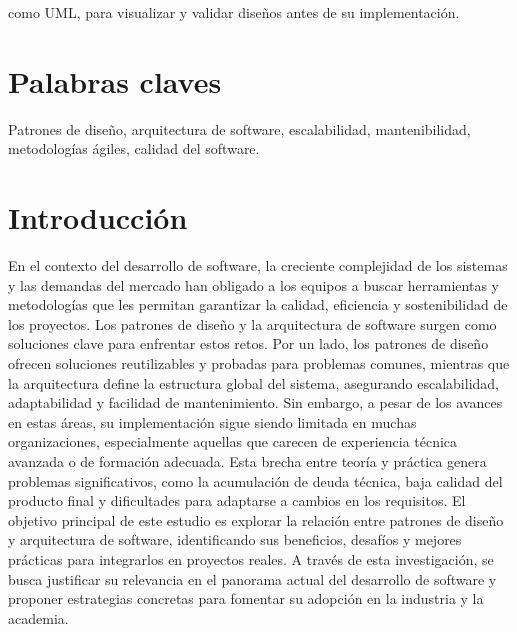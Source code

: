 \documentclass[conference]{IEEEtran}
\begin{document}
como UML, para visualizar y validar diseños antes de su implementación. 


\section{Palabras claves}
Patrones de diseño, arquitectura de software, escalabilidad, mantenibilidad, metodologías ágiles, calidad del software.

\section{Introducci\'on}
En el contexto del desarrollo de software, la creciente complejidad de los sistemas y las demandas del mercado han obligado a los equipos a buscar herramientas y metodologías que les permitan garantizar la calidad, eficiencia y sostenibilidad de los proyectos. Los patrones de diseño y la arquitectura de software surgen como soluciones clave para enfrentar estos retos. Por un lado, los patrones de diseño ofrecen soluciones reutilizables y probadas para problemas comunes, mientras que la arquitectura define la estructura global del sistema, asegurando escalabilidad, adaptabilidad y facilidad de mantenimiento.
Sin embargo, a pesar de los avances en estas áreas, su implementación sigue siendo limitada en muchas organizaciones, especialmente aquellas que carecen de experiencia técnica avanzada o de formación adecuada. Esta brecha entre teoría y práctica genera problemas significativos, como la acumulación de deuda técnica, baja calidad del producto final y dificultades para adaptarse a cambios en los requisitos.
El objetivo principal de este estudio es explorar la relación entre patrones de diseño y arquitectura de software, identificando sus beneficios, desafíos y mejores prácticas para integrarlos en proyectos reales. A través de esta investigación, se busca justificar su relevancia en el panorama actual del desarrollo de software y proponer estrategias concretas para fomentar su adopción en la industria y la academia.
\\
\\
\\
\end{document}
